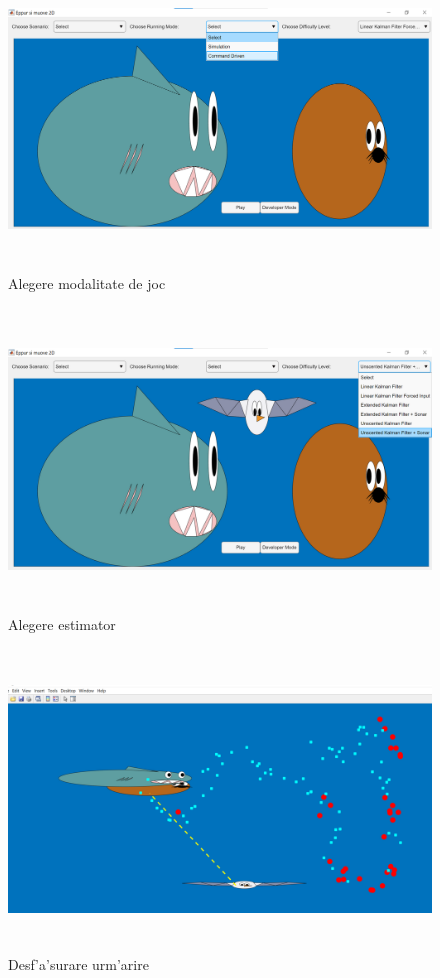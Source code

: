 \documentclass[12pt,a4paper,twoside]{report}
\begin{document}
\begin{figure}[H]
\centering
 \includegraphics[width=160mm,height=80mm,]{img/runmode}
 \caption{Alegere modalitate de joc}
\end{figure}

\begin{figure}[H]
\centering
 \includegraphics[width=160mm,height=80mm,]{img/dificultate}
 \caption{Alegere estimator}
\end{figure}

\begin{figure}[H]
\centering
 \includegraphics[width=160mm,height=80mm,]{img/race}
 \caption{Desf'a'surare urm'arire}
\end{figure}
\end{document}
